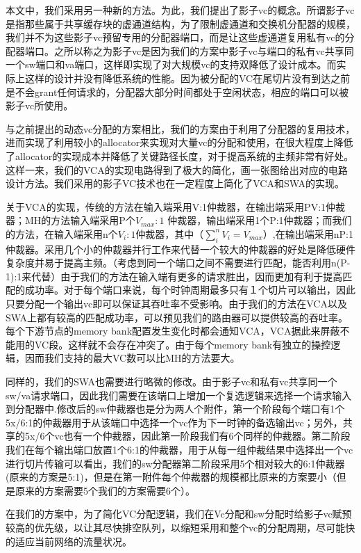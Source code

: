 ﻿\documentclass[10pt,journal]{IEEEtran}
\begin{document}
本文中，我们采用另一种新的方法。为此，我们提出了影子vc的概念。所谓影子vc是指那些属于共享缓存块的虚通道结构，为了限制虚通道和交换机分配器的规模，我们并不为这些影子vc预留专用的分配器端口，而是让这些虚通道复用私有vc的分配器端口。之所以称之为影子vc是因为我们的方案中影子vc与端口的私有vc共享同一个sw端口和va端口，这样即实现了对大规模vc的支持双降低了设计成本。而实际上这样的设计并没有降低系统的性能。因为被分配的VC在尾切片没有到达之前是不会grant任何请求的，分配器大部分时间都处于空闲状态，相应的端口可以被影子vc所使用。

与之前提出的动态vc分配的方案相比，我们的方案由于利用了分配器的复用技术，进而实现了利用较小的allocator来实现对大量vc的分配和使用，在很大程度上降低了allocator的实现成本并降低了关键路径长度，对于提高系统的主频非常有好处。这样一来，我们的VCA的实现电路得到了极大的简化，画一张图给出对应的电路设计方法。我们采用的影子VC技术也在一定程度上简化了VCA和SWA的实现。

关于VCA的实现，传统的方法在输入端采用V:1仲裁器，在输出端采用PV:1仲裁器；MH的方法输入端采用P个$V_{max}:1$ 仲裁器，输出端采用1个P:1仲裁器；而我们的方法，在输入端采用n个$V_i:1$仲裁器，其中（$\sum_{i}^nV_i=V_{max}$）,在输出端采用nP:1 仲裁器。采用几个小的仲裁器并行工作来代替一个较大的仲裁器的好处是降低硬件复杂度并易于提高主频。（考虑到同一个端口之间不需要进行匹配，能否利用n(P-1):1来代替）由于我们的方法在输入端有更多的请求胜出，因而更加有利于提高匹配的成功率。对于每个端口来说，每个时钟周期最多只有１个切片可以输出，因此只要分配一个输出vc即可以保证其吞吐率不受影响。由于我们的方法在VCA以及SWA上都有较高的匹配成功率，可以预见我们的路由器可以提供较高的吞吐率。每个下游节点的memory bank配置发生变化时都会通知VCA，VCA据此来屏蔽不能用的VC段。这样就不会存在冲突了。由于每个memory bank有独立的操控逻辑，因而我们支持的最大VC数可以比MH的方法要大。

同样的，我们的SWA也需要进行略微的修改。由于影子vc和私有vc共享同一个sw/va请求端口，因此我们需要在该端口上增加一个复选逻辑来选择一个请求输入到分配器中.修改后的sw仲裁器也是分为两人个附件，第一个阶段每个端口有1个5x/6:1的仲裁器用于从该端口中选择一个vc作为下一时钟的备选输出vc；另外，共享的5x/6个vc也有一个仲裁器，因此第一阶段我们有6个同样的仲裁器。第二阶段我们在每个输出端口放置1个6:1的仲裁器，用于从每一组仲裁结果中选择出一个vc进行切片传输可以看出，我们的sw分配器第二阶段采用5个相对较大的6:1仲裁器(原来的方案是5:1)，但是在第一附件每个仲裁器的规模都比原来的方案要小（但是原来的方案需要5个我们的方案需要6个）。

在我们的方案中，为了简化VC分配逻辑，我们在Vc分配和sw分配时给影子vc赋预较高的优先级，以让其尽快排空队列，以缩短采用和整个vc的分配周期，尽可能快的适应当前网络的流量状况。
\end{document}
